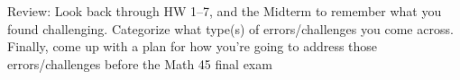 \documentclass[12pt,letterpaper]{hmcpset}
\begin{document}
\begin{problem}
Review: Look back through HW 1–7, and the Midterm to remember what you found challenging.
Categorize what type(s) of errors/challenges you come across. Finally, come up with a plan
for how you’re going to address those errors/challenges before the Math 45 final exam
\end{problem}
\end{document}
